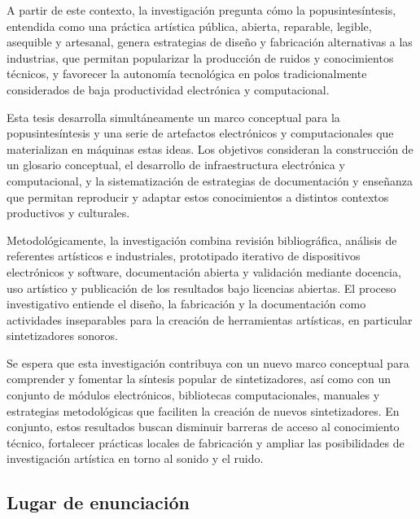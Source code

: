 \documentclass[../candidatura.tex]{subfiles}
\begin{document}

A partir de este contexto, la investigación pregunta cómo la popusintesíntesis, entendida como una práctica artística pública, abierta, reparable, legible, asequible y artesanal, genera estrategias de diseño y fabricación alternativas a las industrias, que permitan popularizar la producción de ruidos y conocimientos técnicos, y favorecer la autonomía tecnológica en polos tradicionalmente considerados de baja productividad electrónica y computacional.


Esta tesis desarrolla simultáneamente un marco conceptual para la popusintesíntesis y una serie de artefactos electrónicos y computacionales que materializan en máquinas estas ideas. Los objetivos consideran la construcción de un glosario conceptual, el desarrollo de infraestructura electrónica y computacional, y la sistematización de estrategias de documentación y enseñanza que permitan reproducir y adaptar estos conocimientos a distintos contextos productivos y culturales.


Metodológicamente, la investigación combina revisión bibliográfica, análisis de referentes artísticos e industriales, prototipado iterativo de dispositivos electrónicos y software, documentación abierta y validación mediante docencia, uso artístico y publicación de los resultados bajo licencias abiertas. El proceso investigativo entiende el diseño, la fabricación y la documentación como actividades inseparables para la creación de herramientas artísticas, en particular sintetizadores sonoros.


Se espera que esta investigación contribuya con un nuevo marco conceptual para comprender y fomentar la síntesis popular de sintetizadores, así como con un conjunto de módulos electrónicos, bibliotecas computacionales, manuales y estrategias metodológicas que faciliten la creación de nuevos sintetizadores. En conjunto, estos resultados buscan disminuir barreras de acceso al conocimiento técnico, fortalecer prácticas locales de fabricación y ampliar las posibilidades de investigación artística en torno al sonido y el ruido.

\subsection{Lugar de enunciación}
\end{document}
